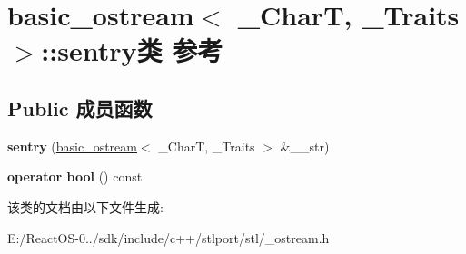 \hypertarget{classbasic__ostream_1_1sentry}{}\section{basic\+\_\+ostream$<$ \+\_\+\+CharT, \+\_\+\+Traits $>$\+:\+:sentry类 参考}
\label{classbasic__ostream_1_1sentry}
\subsection*{Public 成员函数}
\begin{DoxyCompactItemize}
\item 
\mbox{\label{classbasic__ostream_1_1sentry_a13826b7cc6b0f9db0dc2e3c3910c33a8}} 
{\bfseries sentry} (\hyperlink{classbasic__ostream}{basic\+\_\+ostream}$<$ \+\_\+\+CharT, \+\_\+\+Traits $>$ \&\+\_\+\+\_\+str)
\item 
\mbox{\label{classbasic__ostream_1_1sentry_a8f9dee1f964cdfb9366671dfc582a8a0}} 
{\bfseries operator bool} () const
\end{DoxyCompactItemize}


该类的文档由以下文件生成\+:\begin{DoxyCompactItemize}
\item 
E\+:/\+React\+O\+S-\/0../sdk/include/c++/stlport/stl/\+\_\+ostream.\+h\end{DoxyCompactItemize}
